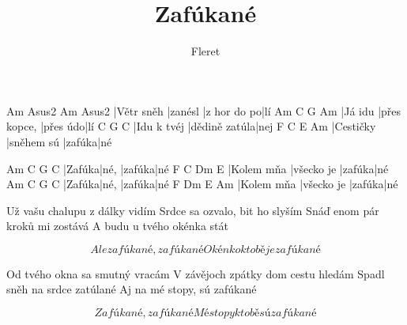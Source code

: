 \documentclass{song}
\title{Zafúkané}
\author{Fleret}
\begin{document}
\strophe
Am         Asus2   Am          Asus2
|Větr sněh |zanésl |z hor do po|lí
Am      C            G        Am
|Já idu |přes kopce, |přes údo|lí
C           G             C
|Idu k tvéj |dědině zatúla|nej
F         C          E      Am
|Cestičky |sněhem sú |zafúka|né
\endstrophe

Am     C    G      C
|Zafúka|né, |zafúka|né
F          C          Dm     E
|Kolem mňa |všecko je |zafúka|né
Am     C    G      C
|Zafúka|né, |zafúka|né
F          Dm         E      Am
|Kolem mňa |všecko je |zafúka|né
\endstrophe

\strophe*
Už vašu chalupu z dálky vidím
Srdce sa ozvalo, bit ho slyším
Snáď enom pár kroků mi zostává
A budu u tvého okénka stát
\endstrophe

\[ Ale zafúkané, zafúkané
Okénko k tobě je zafúkané \]
\endstrophe

\strophe*
Od tvého okna sa smutný vracám
V závějoch zpátky dom cestu hledám
Spadl sněh na srdce zatúlané
Aj na mé stopy, sú zafúkané
\endstrophe

\[ Zafúkané, zafúkané
Mé stopy k tobě sú zafúkané \]
\endstrophe

\end{document}
